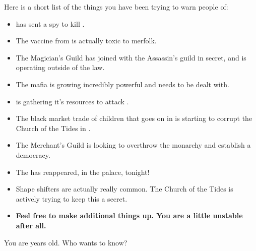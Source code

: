 \documentclass[char]{NeptuneBall}
\begin{document}
Here is a short list of the things you have been trying to warn people of:
\begin{itemize}
 \item \pPacifica{} has sent a spy to kill \cKing{}.
 \item The \ppolio{} vaccine from \pAmerica{} is actually toxic to merfolk.
 \item The Magician's Guild has joined with the Assassin's guild in secret, and is operating outside of the law.
 \item The mafia is growing incredibly powerful and needs to be dealt with.
 \item \pIndia{} is gathering it's resources to attack \pAtlantis{}.
 \item The black market trade of children that goes on in \pPacifica{} is starting to corrupt the Church of the Tides in \pAtlantis{}.
 \item The Merchant's Guild is looking to overthrow the monarchy and establish a democracy.
 \item The \iWishingStone{\MYname} has reappeared, in the palace, tonight!
 \item Shape shifters are actually really common. The Church of the Tides is actively trying to keep this a secret.
 \item {\bf Feel free to make additional things up. You are a little unstable after all.}
\end{itemize}

\begin{itemz}[Trivia]
  \item You are \cOsiris{\MYnumber} years old. Who wants to know?
\end{itemz}
\end{document}
